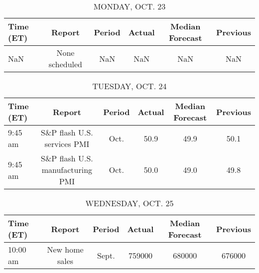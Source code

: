 \documentclass{article}%
\begin{document}
%
\normalsize%


\begin{table}[htbp]%
\caption{MONDAY, OCT. 23}%
\centering%
\begin{adjustbox}{width=1\textwidth}%
\begin{tabular}{lccccc}
\toprule
Time (ET) &         Report & Period & Actual & Median Forecast & Previous \\
\midrule
      NaN & None scheduled &    NaN &    NaN &             NaN &      NaN \\
\bottomrule
\end{tabular}
%
\end{adjustbox}%
\end{table}

%


\begin{table}[htbp]%
\caption{TUESDAY, OCT. 24}%
\centering%
\begin{adjustbox}{width=1\textwidth}%
\begin{tabular}{lccccc}
\toprule
Time (ET) &                           Report & Period & Actual & Median Forecast & Previous \\
\midrule
  9:45 am &      S\&P flash U.S. services PMI &   Oct. &   50.9 &            49.9 &     50.1 \\
  9:45 am & S\&P flash U.S. manufacturing PMI &   Oct. &   50.0 &            49.0 &     49.8 \\
\bottomrule
\end{tabular}
%
\end{adjustbox}%
\end{table}

%


\begin{table}[htbp]%
\caption{WEDNESDAY, OCT. 25}%
\centering%
\begin{adjustbox}{width=1\textwidth}%
\begin{tabular}{lccccc}
\toprule
Time (ET) &         Report & Period & Actual & Median Forecast & Previous \\
\midrule
 10:00 am & New home sales &  Sept. & 759000 &          680000 &   676000 \\
\bottomrule
\end{tabular}
%
\end{adjustbox}%
\end{table}

%
\end{document}
